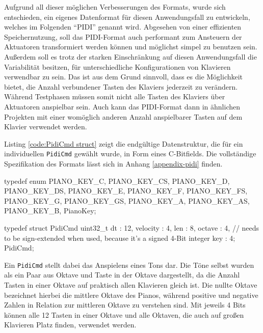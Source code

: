 Aufgrund all dieser möglichen Verbesserungen des Formats, wurde sich entschieden, ein eigenes Datenformat für diesen Anwendungsfall zu entwickeln, welches im Folgenden \enquote{\ac{PIDI}} genannt wird.
Abgesehen von einer effizienten Speichernutzung, soll das \ac{PIDI}-Format auch performant zum Ansteuern der Aktuatoren transformiert werden können und möglichst simpel zu benutzen sein.
Außerdem soll es trotz der starken Einschränkung auf diesen Anwendungsfall die Variabilität besitzen, für unterschiedliche Konfigurationen von Klavieren verwendbar zu sein.
Das ist aus dem Grund sinnvoll, dass es die Möglichkeit bietet, die Anzahl verbundener Tasten des Klaviers jederzeit zu verändern.
Während Testphasen müssen somit nicht alle Tasten des Klaviers über Aktuatoren anspielbar sein.
Auch kann das \ac{PIDI}-Format dann in ähnlichen Projekten mit einer womöglich anderen Anzahl anspielbarer Tasten auf dem Klavier verwendet werden.

Listing \ref{code:PidiCmd struct} zeigt die endgültige Datenstruktur, die für ein individuellen \lstinline{PidiCmd} gewählt wurde, in Form eines C-Bitfields.
Die vollständige Spezifikation des Formats lässt sich in Anhang \ref{appendix-pidi} finden.

\begin{UnbrokenCodePage}[style=CStyle, caption={Definition eines \ac{PIDI}-Kommands}, label={code:PidiCmd struct}]
typedef enum {
    PIANO_KEY_C,
    PIANO_KEY_CS,
    PIANO_KEY_D,
    PIANO_KEY_DS,
    PIANO_KEY_E,
    PIANO_KEY_F,
    PIANO_KEY_FS,
    PIANO_KEY_G,
    PIANO_KEY_GS,
    PIANO_KEY_A,
    PIANO_KEY_AS,
    PIANO_KEY_B,
} PianoKey;

typedef struct PidiCmd {
    uint32_t dt : 12,
    velocity    : 4,
    len         : 8,
    octave      : 4, // needs to be sign-extended when used, because it's a signed 4-Bit integer
    key         : 4;
} PidiCmd;
\end{UnbrokenCodePage}

Ein \lstinline{PidiCmd} stellt dabei das Anspielens eines Tons dar.
Die Töne selbst wurden als ein Paar aus Oktave und Taste in der Oktave dargestellt, da die Anzahl Tasten in einer Oktave auf praktisch allen Klavieren gleich ist.
Die nullte Oktave bezeichnet hierbei die mittlere Oktave des Pianos, während positive und negative Zahlen in Relation zur mittleren Oktave zu verstehen sind.
Mit jeweils 4 Bits können alle 12 Tasten in einer Oktave und alle Oktaven, die auch auf großen Klavieren Platz finden, verwendet werden.

